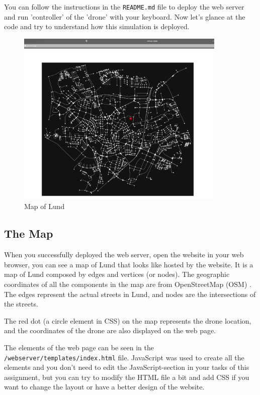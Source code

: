 \documentclass{article}
\begin{document}
You can follow the instructions in the \texttt{README.md} file to deploy the web server and run 'controller' of the 'drone' with your keyboard. Now let's glance at the code and try to understand how this simulation is deployed.

\begin{figure}[h!]
    \centering
    \includegraphics[trim=200 100 200 200,clip, width=100mm]{map.png}
    \caption{Map of Lund}
    \label{fig:map}
\end{figure}

\subsection{The Map}
When you successfully deployed the web server, open the website in your web browser, you can see a map of Lund that looks like  hosted by the website. It is a map of Lund composed by edges and vertices (or nodes). The geographic coordinates of all the components in the map are from OpenStreetMap (OSM) \cite{OSM}. The edges represent the actual streets in Lund, and nodes are the intersections of the streets.


The red dot (a circle element in CSS) on the map represents the drone location, and the coordinates of the drone are also displayed on the web page.

The elements of the web page can be seen in the \texttt{/webserver/templates/index.html} file. JavaScript was used to create all the elements and you don't need to edit the JavaScript-section in your tasks of this assignment, but you can try to modify the HTML file a bit and add CSS if you want to change the layout or have a better design of the website.
\end{document}
